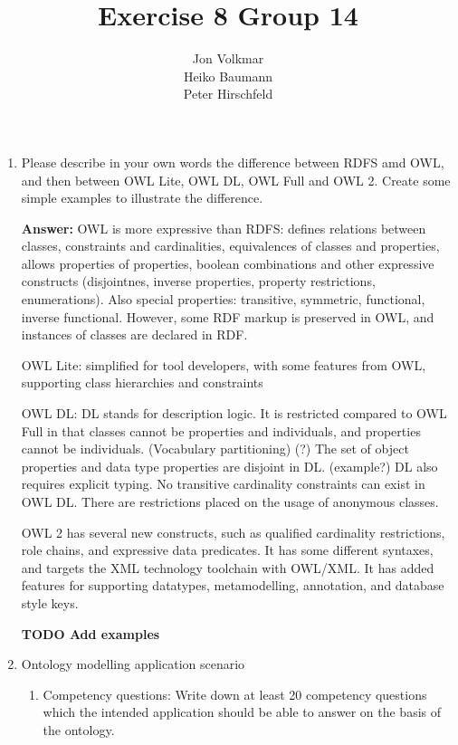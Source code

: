 \documentclass[10pt,a4paper]{article}
\title{\textbf{Exercise 8 Group 14}}
\author{Jon Volkmar\\
		Heiko Baumann\\
		Peter Hirschfeld}
\date{}
\begin{document}
\maketitle


\begin{enumerate}
\item Please describe in your own words the difference between RDFS amd OWL, and 
then between OWL Lite, OWL DL, OWL Full and OWL 2. Create some simple 
examples to illustrate the difference.

\textbf{Answer:}
OWL is more expressive than RDFS: defines relations between classes, constraints and cardinalities, equivalences of classes and properties, allows properties of properties, boolean combinations and other expressive constructs (disjointnes, inverse properties, property restrictions, enumerations). Also special properties: transitive, symmetric, functional, inverse functional. However, some RDF markup is preserved in OWL, and instances of classes are declared in RDF.

OWL Lite: simplified for tool developers, with some features from OWL, supporting class hierarchies and constraints

OWL DL: DL stands for description logic. It is restricted compared to OWL Full in that classes cannot be properties and individuals, and properties cannot be individuals. (Vocabulary partitioning) (?) The set of object properties and data type properties are disjoint in DL. (example?) DL also requires explicit typing. No transitive cardinality constraints can exist in OWL DL. There are restrictions placed on the usage of anonymous classes.

OWL 2 has several new constructs, such as qualified cardinality restrictions, role chains, and expressive data predicates. It has some different syntaxes, and targets the XML technology toolchain with OWL/XML. It has added features for supporting datatypes, metamodelling, annotation, and database style keys. 

\textbf{TODO Add examples}

\item Ontology modelling application scenario

\begin{enumerate}

\item Competency questions: Write down at least 20 competency questions which the intended application should be able to answer on the basis of the ontology.


\end{enumerate}
\end{enumerate}
\end{document}
